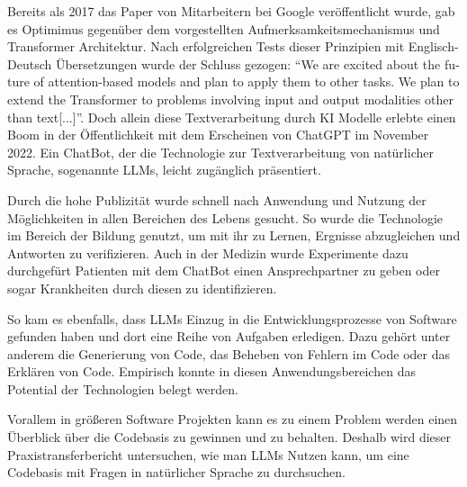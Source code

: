 \documentclass[../main.tex]{subfiles}
\begin{document}
Bereits als 2017 das Paper  von Mitarbeitern bei Google veröffentlicht wurde, gab es Optimimus gegenüber dem vorgestellten Aufmerksamkeitsmechanismus und Transformer Architektur.
Nach erfolgreichen Tests dieser Prinzipien mit Englisch-Deutsch Übersetzungen wurde der Schluss gezogen: \foreignquote{english}{We are excited about the future of attention-based models and plan to apply them to other tasks. We plan to extend the Transformer to problems involving input and output modalities other than text[...]}\cite*{vaswani2017attention}.
Doch allein diese Textverarbeitung durch KI Modelle erlebte einen Boom in der Öffentlichkeit mit dem Erscheinen von ChatGPT im November 2022.
Ein ChatBot, der die Technologie zur Textverarbeitung von natürlicher Sprache, sogenannte \glspl{LLM}, leicht zugänglich präsentiert. \cite{chatgpt2023}

Durch die hohe Publizität wurde schnell nach Anwendung und Nutzung der Möglichkeiten in allen Bereichen des Lebens gesucht.
So wurde die Technologie im Bereich der Bildung genutzt, um mit ihr zu Lernen, Ergnisse abzugleichen und Antworten zu verifizieren.
Auch in der Medizin wurde Experimente dazu durchgefürt Patienten mit dem ChatBot einen Ansprechpartner zu geben oder sogar Krankheiten durch diesen zu identifizieren.
\cite*{liu2023summary}

So kam es ebenfalls, dass \glspl{LLM} Einzug in die Entwicklungsprozesse von Software gefunden haben und dort eine Reihe von Aufgaben erledigen.
Dazu gehört unter anderem die Generierung von Code, das Beheben von Fehlern im Code oder das Erklären von Code.
Empirisch konnte in diesen Anwendungsbereichen das Potential der Technologien belegt werden.
\cite*{tian2023chatgpt}

Vorallem in größeren Software Projekten kann es zu einem Problem werden einen Überblick über die Codebasis zu gewinnen und zu behalten.
Deshalb wird dieser Praxistransferbericht untersuchen, wie man \glspl{LLM} Nutzen kann, um eine Codebasis mit Fragen in natürlicher Sprache zu durchsuchen.
\end{document}
